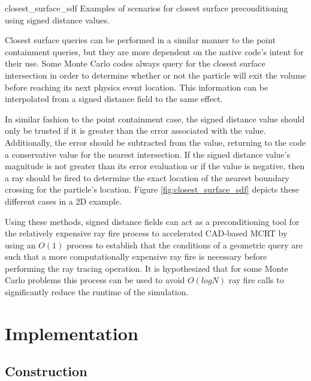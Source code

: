              {closest_surface_sdf}
             {Examples of scenarios for closest surface preconditioning using signed distance values.}
             {
               Closest surface queries can be performed in a similar manner to
               the point containment queries, but they are more dependent on the
               native code's intent for their use. Some Monte Carlo codes always
               query for the closest surface intersection in order to
               determine whether or not the particle will exit the volume before
               reaching its next physics event location. This information can be
               interpolated from a signed distance field to the same effect.
               
               In similar fashion to the point containment case, the signed
               distance value should only be trusted if it is greater than the
               error associated with the value. Additionally, the error should
               be subtracted from the value, returning to the code a
               conservative value for the nearest intersection. If the signed
               distance value's magnitude is not greater than its error
               evaluation or if the value is negative, then a ray should be
               fired to determine the exact location of the nearest boundary
               crossing for the particle's location. Figure
               \ref{fig:closest_surface_sdf} depicts these different cases in a
               2D example.
             }
             
Using these methods, signed distance fields can act as a preconditioning tool
for the relatively expensive ray fire process to accelerated CAD-based MCRT by
using an $O(1)$ process to establish that the conditions of a geometric query
are such that a more computationally expensive ray fire is necessary before
performing the ray tracing operation. It is hypothesized that for some Monte
Carlo problems this process can be used to avoid $O(logN)$ ray fire calls to
significantly reduce the runtime of the simulation.

\section{Implementation}

\subsection{Construction}

